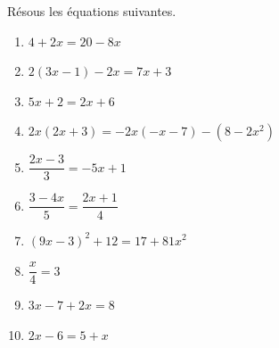 \documentclass[../../syllabus_2.tex]{subfiles}
\begin{document}
\begin{exercise}
  Résous les équations suivantes.
  \begin{enumerate}[cols=2]
    \item $4 + 2x = 20 - 8x$
    \item $2(3x - 1) - 2x = 7x + 3$
    \item $5x + 2 = 2x + 6$
    \item $2x(2x + 3) = - 2x(-x - 7) - (8 - 2x^2)$
    \item $\dfrac{2x - 3}{3} =  - 5x + 1$
    \item $\dfrac{3 - 4x}{5} = \dfrac{2x + 1}{4}$
    \item $(9x - 3)^{2} + 12 = 17 + 81x^2$
    \item $\dfrac{x}{4} = 3$
    \item $3x - 7 + 2x = 8$
    \item $2x - 6 = 5 + x$
  \end{enumerate}
\end{exercise}
\end{document}
